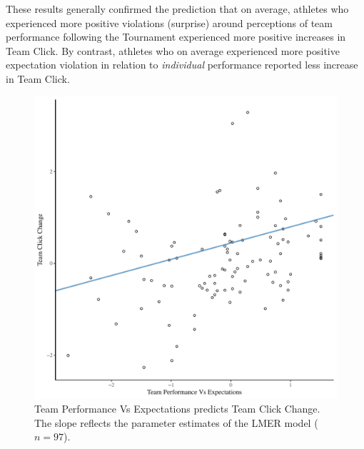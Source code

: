 \begin{CJK}{UTF8}{gbsn}
These results generally confirmed the prediction that on average, athletes who experienced more positive violations (surprise) around perceptions of team performance following the Tournament experienced more positive increases in Team Click. By contrast, athletes who on average experienced more positive expectation violation in relation to \textit{individual} performance reported less increase in Team Click.





    \begin{figure}[htbp]
      \centering
    \includegraphics[scale=.5]{images/teamPerfClickDeltaModelSlope.pdf}
      \caption{Team Performance Vs Expectations predicts Team Click Change. The slope reflects the parameter estimates of the LMER model ($n = 97$).}
      \label{fig:teamPerfClickDeltaModelSlope}
    \end{figure}



\end{CJK}
